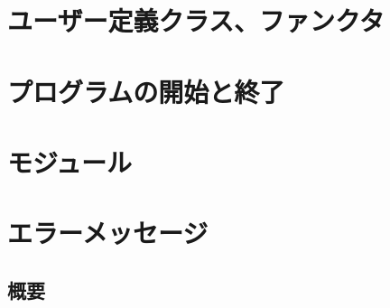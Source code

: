 \documentclass[12pt,a4paper]{jarticle}
\begin{document}


\newpage

\section{ユーザー定義クラス、ファンクタ}



\newpage

\section{プログラムの開始と終了}



\newpage

\section{モジュール}



\newpage

\section{エラーメッセージ}

\subsection{概要}




\end{document}
